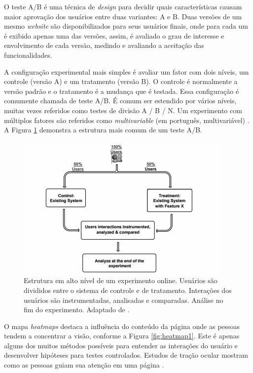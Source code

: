 \documentclass[12pt]{article}
\begin{document}
O teste A/B é uma técnica de \textit{design} para decidir quais características causam maior aprovação dos usuários entre duas variantes: A e B. Duas versões de um mesmo \textit{website} são disponibilizados para seus usuários finais, onde para cada um é exibido apenas uma das versões, assim, é avaliado o grau de interesse e envolvimento de cada versão, medindo e avaliando a aceitação das funcionalidades.

A configuração experimental mais simples é avaliar um fator com dois níveis, um controle (versão A) e um tratamento (versão B). O controle é normalmente a versão padrão e o tratamento é a mudança que é testada. Essa configuração é comumente chamada de teste A/B. É comum ser estendido por vários níveis, muitas vezes referidos como testes de divisão A / B / N. Um experimento com
múltiplos fatores são referidos como \textit{multivariable} (em português, multivariável) \cite{kohavi2010online}. A Figura \ref{fig:onlineExp1} demonstra a estrutura mais comum de um teste A/B.

\begin{figure}[ht]
\centering
\includegraphics[width=.8\textwidth]{fig2.png}
\caption{Estrutura em alto nível de um experimento online. Usuários são divididos entre o sistema de controle e de tratamento. Interações dos usuários são instrumentadas, analisadas e comparadas. Análise no fim do experimento. Adaptado de \cite{kohavi2010online}.}
\label{fig:onlineExp1}
\end{figure}

O mapa \textit{heatmaps} destaca a influência do conteúdo da página onde as pessoas tendem a concentrar a visão, conforme a Figura \ref{fig:heatmap1}. Este é apenas alguns dos muitos métodos possíveis para entender as interações do usuário e desenvolver hipóteses para testes controlados. Estudos de tração ocular mostram como as pessoas guiam sua atenção em uma página \cite{goward:13}.
\end{document}
